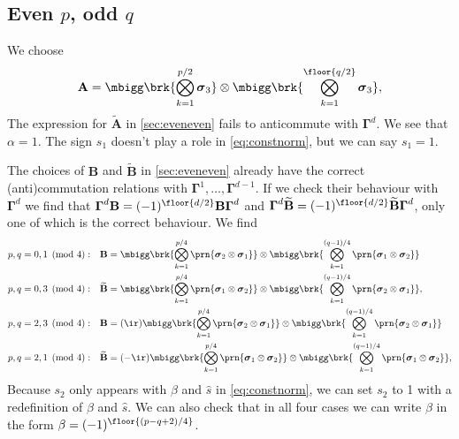 \documentclass[11pt]{article}
\newcommand{\Gammab}{\boldsymbol{\Gamma}}
\newcommand{\A}{\mathbf{A}}
\newcommand{\B}{\mathbf{B}}
\newcommand{\At}{\widetilde{\mathbf{A}}}
\newcommand{\Bt}{\widetilde{\mathbf{B}}}
\newcommand{\sigmab}{\boldsymbol{\sigma}}
\begin{document}

\subsection{Even \texorpdfstring{$p$}{p}, odd \texorpdfstring{$q$}{q}}\label{sec:evenodd}

We choose
%
\begin{equation*}
  \A =  \mbigg\brk{\bigotimes_{k=1}^{{p/2}} \sigmab_3}
        \otimes \mbigg\brk{\bigotimes_{k=1}^{\floor{q/2}} \sigmab_3},
\end{equation*}
%
The expression for $\At$ in \cref{sec:eveneven} fails to anticommute with $\Gammab^d$.
We see that $\alpha = 1$.
The sign $s_1$ doesn't play a role in \cref{eq:constnorm}, but we can say $s_1 = 1$.

The choices of $\B$ and $\Bt$ in \cref{sec:eveneven} already have the correct (anti)commutation relations with $\Gammab^1, \ldots, \Gammab^{d-1}$.
If we check their behaviour with $\Gammab^d$ we find that $\Gammab^d \B = (-1)^{\floor{d/2}}\B \Gammab^d$ and $\Gammab^d \Bt = (-1)^{\floor{d/2}}\Bt \Gammab^d$, only one of which is the correct behaviour.
We find
%
\begin{equation*}
\begin{aligned}
  p,q &= 0,1 \pmod 4: &
  \B &= \mbigg\brk{\bigotimes_{k=1}^{p/4} \prn{\sigmab_2 \otimes \sigmab_1}} \otimes
        \mbigg\brk{\bigotimes_{k=1}^{(q-1)/4} \prn{\sigmab_1 \otimes \sigmab_2}} \\
  p,q &= 0,3 \pmod 4: &
  \Bt &= \mbigg\brk{\bigotimes_{k=1}^{p/4} \prn{\sigmab_1 \otimes \sigmab_2}} \otimes
        \mbigg\brk{\bigotimes_{k=1}^{(q-1)/4} \prn{\sigmab_2 \otimes \sigmab_1}},
  \\
  p,q &= 2,3 \pmod 4: &
  \B &= (\ir)
        \mbigg\brk{\bigotimes_{k=1}^{p/4} \prn{\sigmab_2 \otimes \sigmab_1}} \otimes
        \mbigg\brk{\bigotimes_{k=1}^{(q-1)/4} \prn{\sigmab_2 \otimes \sigmab_1}} \\
  p,q &= 2,1 \pmod 4: &
  \Bt &= (-\ir)
        \mbigg\brk{\bigotimes_{k=1}^{p/4} \prn{\sigmab_1 \otimes \sigmab_2}} \otimes
        \mbigg\brk{\bigotimes_{k=1}^{(q-1)/4} \prn{\sigmab_1 \otimes \sigmab_2}},
\end{aligned}
\end{equation*}
%
Because $s_2$ only appears with $\beta$ and $\hat{s}$ in \cref{eq:constnorm}, we can set $s_2$ to 1  with a redefinition of $\beta$ and $\hat{s}$.
We can also check that in all four cases we can write $\beta$ in the form $\beta = (-1)^{\floor{(p-q+2)/4}}$.
\end{document}
